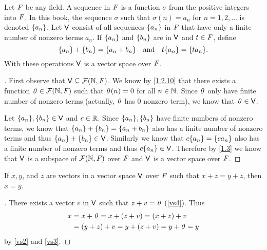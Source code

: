 \begin{eg}\label{1.2.13}
  Let \(\mathit{F}\) be any field.
  A sequence in \(\mathit{F}\) is a function \(\sigma\) from the positive integers into \(\mathit{F}\).
  In this book, the sequence \(\sigma\) such that \(\sigma(n) = a_n\) for \(n = 1, 2, \dots\) is denoted \(\left\lbrace a_n\right\rbrace\).
  Let \(\mathsf{V}\) consist of all sequences \(\left\lbrace a_n\right\rbrace\) in \(\mathit{F}\) that have only a finite number of nonzero terms \(a_n\).
  If \(\left\lbrace a_n\right\rbrace\) and \(\left\lbrace b_n\right\rbrace\) are in \(\mathsf{V}\) and \(t \in \mathit{F}\), define
  \[
    \set{a_n} + \set{b_n} = \set{a_n + b_n} \quad \text{and} \quad t\set{a_n} = \set{ta_n}.
  \]
  With these operations \(\mathsf{V}\) is a vector space over \(\mathit{F}\).
\end{eg}

\begin{proof}[]
  First observe that \(\mathsf{V} \subseteq \mathcal{F}(\mathbb{N}, \mathit{F})\).
  We know by \cref{1.2.10} that there exists a function \(\mathit{0} \in \mathcal{F}(\mathbb{N}, \mathit{F})\) such that \(\mathit{0}(n) = 0\) for all \(n \in \mathbb{N}\).
  Since \(\mathit{0}\) only have finite number of nonzero terms (actually, \(\mathit{0}\) has \(0\) nonzero term), we know that \(\mathit{0} \in \mathsf{V}\).

  Let \(\B{a_n}, \B{b_n} \in \V\) and \(c \in \mathbb{R}\).
  Since \(\B{a_n}, \B{b_n}\) have finite numbers of nonzero terms, we know that \(\left\lbrace a_n\right\rbrace + \left\lbrace b_n\right\rbrace = \left\lbrace a_n + b_n\right\rbrace\) also has a finite number of nonzero terms and thus \(\left\lbrace a_n\right\rbrace + \left\lbrace b_n\right\rbrace \in \mathsf{V}\).
  Similarly we know that \(c\B{a_n} = \B{ca_n}\) also has a finite number of nonzero terms and thus \(c\B{a_n} \in \V\).
  Therefore by \cref{1.3} we know that \(\mathsf{V}\) is a subspace of \(\mathcal{F}(\mathbb{N}, \mathit{F})\) over \(\mathit{F}\) and \(\mathsf{V}\) is a vector space over \(\mathit{F}\).
\end{proof}

\begin{thm}\label{1.1}
  If \(x, y\), and \(z\) are vectors in a vector space \(\mathsf{V}\) over \(\mathit{F}\) such that \(x + z = y + z\), then \(x = y\).
\end{thm}

\begin{proof}[]
  There exists a vector \(v\) in \(\mathsf{V}\) such that \(z + v = \mathit{0}\) (\ref{vs4}).
  Thus
  \begin{align*}
    x & = x + \mathit{0} = x + (z + v) = (x + z) + v     \\
      & = (y + z) + v = y + (z + v) = y + \mathit{0} = y
  \end{align*}
  by \ref{vs2} and \ref{vs3}.
\end{proof}

